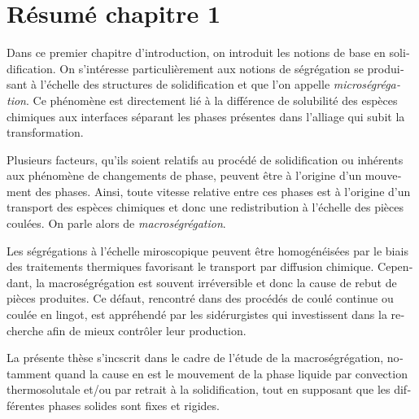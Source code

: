 \clearpage
\section*{Résumé chapitre 1}

\begin{otherlanguage}{french}
{\small

Dans ce premier chapitre d'introduction, on introduit les notions de base en solidification. 
On s'intéresse particulièrement aux notions de ségrégation se produisant à l'échelle des structures 
de solidification et que l'on appelle \emph{microségrégation}. Ce phénomène est directement lié à la 
différence de solubilité des espèces chimiques aux interfaces séparant les phases présentes dans 
l'alliage qui subit la transformation.


Plusieurs facteurs, qu'ils soient relatifs au procédé de solidification ou inhérents aux phénomène de changements de phase,
peuvent être à l'origine d'un mouvement des phases. 
Ainsi, toute vitesse relative entre ces phases est à l'origine d'un transport des espèces chimiques
et donc une redistribution à l'échelle des pièces coulées. On parle alors de \emph{macroségrégation}.


Les ségrégations à l'échelle miroscopique peuvent être homogénéisées par le biais 
des traitements thermiques favorisant le transport par diffusion chimique.
Cependant, la macroségrégation est souvent irréversible et donc la cause de rebut de pièces produites. 
Ce défaut, rencontré dans des procédés de coulé continue ou coulée en lingot, est appréhendé par les
sidérurgistes qui investissent dans la recherche afin de mieux contrôler leur production.

La présente thèse s'incscrit dans le cadre de l'étude de la macroségrégation, notamment quand la cause en est
le mouvement de la phase liquide par convection thermosolutale et/ou par retrait à la solidification, tout en supposant
que les différentes phases solides sont fixes et rigides.


}
\end{otherlanguage}

